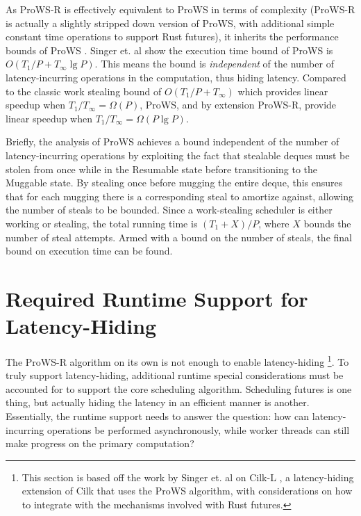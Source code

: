 \documentclass[bsc,frontabs,singlespacing,parskip,deptreport,normalheadings]{infthesis}
\begin{document}
As ProWS-R is effectively equivalent to ProWS in terms of complexity (ProWS-R is
actually a slightly stripped down version of ProWS, with additional simple
constant time operations to support Rust futures), it inherits the performance
bounds of ProWS \cite{singer_proactive_2019, singer_scheduling_2019}. Singer et.
al show the execution time bound of ProWS is \(O(T_1 / P + T_\infty \lg P)\).
This means the bound is \textit{independent} of the number of latency-incurring operations in
the computation, thus hiding latency. Compared to the classic work stealing
bound of \(O(T_1 / P + T_\infty)\) which provides linear speedup when \(T_1 /
T_\infty = \Omega(P)\), ProWS, and by extension ProWS-R, provide linear speedup
when \(T_1 / T_\infty = \Omega(P \lg P)\).

Briefly, the analysis of ProWS achieves a bound independent of the number of
latency-incurring operations by exploiting the fact that stealable deques must
be stolen from once while in the Resumable state before transitioning to the
Muggable state. By stealing once before mugging the entire deque, this ensures
that for each mugging there is a corresponding steal to amortize against,
allowing the number of steals to be bounded. Since a work-stealing scheduler is
either working or stealing, the total running time is \((T_1 + X) / P\), where
\(X\) bounds the number of steal attempts. Armed with a bound on the number of
steals, the final bound on execution time can be found.

\section{Required Runtime Support for Latency-Hiding}
\label{section:required_runtime_support_for_latency_hiding}

The ProWS-R algorithm on its own is not enough to enable latency-hiding
\footnote{This section is based off the work by Singer et. al on Cilk-L
\cite{singer_scheduling_2019}, a latency-hiding extension of Cilk that uses the
ProWS algorithm, with considerations on how to integrate with the mechanisms
involved with Rust futures.}. To truly support latency-hiding, additional
runtime special considerations must be accounted for to support the core
scheduling algorithm. Scheduling futures is one thing, but actually hiding the
latency in an efficient manner is another. Essentially, the runtime support
needs to answer the question: how can latency-incurring operations be performed
asynchronously, while worker threads can still make progress on the primary
computation?
\end{document}
